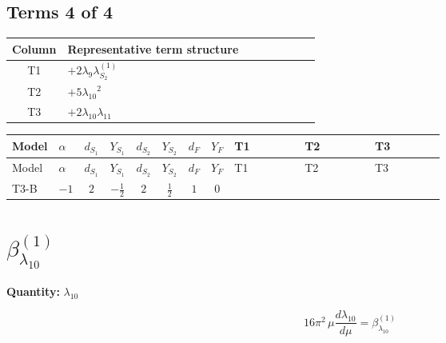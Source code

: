 \documentclass[8pt]{article}
\begin{document}
\begin{landscape}
\subsection*{Terms 4 of 4}
\begin{center}
\begin{tabular}{@{}c >{\raggedright\arraybackslash}p{0.82\linewidth}@{}}
\toprule
Column & Representative term structure \\
\midrule
T1 & \(\displaystyle +2 {\lambda_{9}} {\lambda_{S_2}^{(1)}}\) \\
\midrule
T2 & \(\displaystyle +5 {\lambda_{10}}^2\) \\
\midrule
T3 & \(\displaystyle +2 {\lambda_{10}} {\lambda_{11}}\) \\
\midrule
\bottomrule
\end{tabular}
\end{center}
\smallskip
\tiny
\begin{longtable}{@{}llcccccc >{\raggedright\arraybackslash}p{0.21\linewidth} >{\raggedright\arraybackslash}p{0.21\linewidth} >{\raggedright\arraybackslash}p{0.21\linewidth}@{}}
\toprule
Model & $\alpha$ & $d_{S_1}$ & $Y_{S_1}$ & $d_{S_2}$ & $Y_{S_2}$ & $d_F$ & $Y_F$ & T1 & T2 & T3 \\
\midrule
\endfirsthead
\toprule
Model & $\alpha$ & $d_{S_1}$ & $Y_{S_1}$ & $d_{S_2}$ & $Y_{S_2}$ & $d_F$ & $Y_F$ & T1 & T2 & T3 \\
\midrule
\endhead
T3-B & $-1$ & $2$ & $-\frac{1}{2}$ & $2$ & $\frac{1}{2}$ & $1$ & $0$ & \scriptsize\adjustbox{max width=\linewidth}{$\begin{gathered} +2 {\lambda_{9}} {\lambda_{S_2}^{(1)}}\end{gathered}$} & \scriptsize\adjustbox{max width=\linewidth}{$\begin{gathered} +5 {\lambda_{10}}^2 \\ +5 {\lambda_{11}}^2\end{gathered}$} & \scriptsize\adjustbox{max width=\linewidth}{$\begin{gathered} +2 {\lambda_{10}} {\lambda_{11}}\end{gathered}$} \\
\midrule
\bottomrule
\end{longtable}
\clearpage
\section*{$\beta_{\lambda_{10}}^{(1)}$}
\noindent\textbf{Quantity: }$\lambda_{10}$\par\smallskip
\[16\pi^2\,\mu\frac{d \lambda_{10}}{d\mu}=\beta_{\lambda_{10}}^{(1)}\]

\end{landscape}
\end{document}
